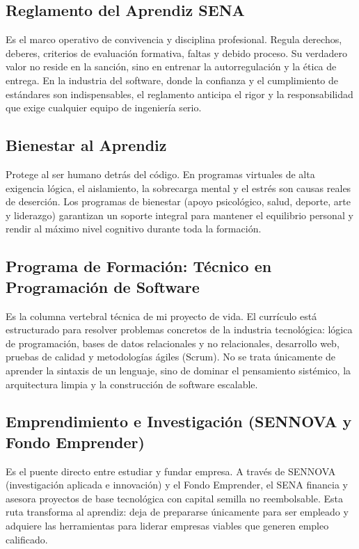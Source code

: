 \documentclass[12pt,letterpaper]{article}
\begin{document}
\subsection*{Reglamento del Aprendiz SENA}
Es el marco operativo de convivencia y disciplina profesional. Regula derechos, deberes, criterios de evaluación formativa, faltas y debido proceso. Su verdadero valor no reside en la sanción, sino en entrenar la autorregulación y la ética de entrega. En la industria del software, donde la confianza y el cumplimiento de estándares son indispensables, el reglamento anticipa el rigor y la responsabilidad que exige cualquier equipo de ingeniería serio.

\subsection*{Bienestar al Aprendiz}
Protege al ser humano detrás del código. En programas virtuales de alta exigencia lógica, el aislamiento, la sobrecarga mental y el estrés son causas reales de deserción. Los programas de bienestar (apoyo psicológico, salud, deporte, arte y liderazgo) garantizan un soporte integral para mantener el equilibrio personal y rendir al máximo nivel cognitivo durante toda la formación.

\subsection*{Programa de Formación: Técnico en Programación de Software}
Es la columna vertebral técnica de mi proyecto de vida. El currículo está estructurado para resolver problemas concretos de la industria tecnológica: lógica de programación, bases de datos relacionales y no relacionales, desarrollo web, pruebas de calidad y metodologías ágiles (Scrum). No se trata únicamente de aprender la sintaxis de un lenguaje, sino de dominar el pensamiento sistémico, la arquitectura limpia y la construcción de software escalable.

\subsection*{Emprendimiento e Investigación (SENNOVA y Fondo Emprender)}
Es el puente directo entre estudiar y fundar empresa. A través de SENNOVA (investigación aplicada e innovación) y el Fondo Emprender, el SENA financia y asesora proyectos de base tecnológica con capital semilla no reembolsable. Esta ruta transforma al aprendiz: deja de prepararse únicamente para ser empleado y adquiere las herramientas para liderar empresas viables que generen empleo calificado.
\end{document}
